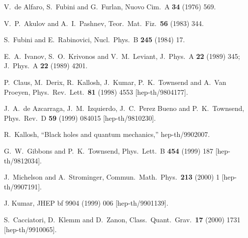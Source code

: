 \documentclass[a4paper,12pt]{article}
\begin{document}
\begin{thebibliography}{99}

V.~de Alfaro, S.~Fubini and G.~Furlan,
Nuovo Cim.\ A {\bf 34} (1976) 569.

V.~P.~Akulov and A.~I.~Pashnev,
Teor.\ Mat.\ Fiz.\  {\bf 56} (1983) 344.

S.~Fubini and E.~Rabinovici,
Nucl.\ Phys.\ B {\bf 245} (1984) 17.

E.~A.~Ivanov, S.~O.~Krivonos and V.~M.~Leviant,
J.\ Phys.\ A {\bf 22} (1989) 345;
J.\ Phys.\ A {\bf 22} (1989) 4201.

P.~Claus, M.~Derix, R.~Kallosh, J.~Kumar, P.~K.~Townsend and
A.~Van Proeyen,
Phys.\ Rev.\ Lett.\  {\bf 81} (1998) 4553
[hep-th/9804177].


J.~A.~de Azcarraga, J.~M.~Izquierdo, J.~C.~Perez Bueno and
P.~K.~Townsend,
Phys.\ Rev.\ D {\bf 59} (1999) 084015
[hep-th/9810230].


R.~Kallosh,
``Black holes and quantum mechanics,''
hep-th/9902007.


G.~W.~Gibbons and P.~K.~Townsend,
Phys.\ Lett.\ B {\bf 454} (1999) 187
[hep-th/9812034].


J.~Michelson and A.~Strominger,
Commun.\ Math.\ Phys.\  {\bf 213} (2000) 1
[hep-th/9907191].


J. Kumar,
JHEP {bf 9904} (1999)  006
[hep-th/9901139].


S.~Cacciatori, D.~Klemm and D.~Zanon,
Class.\ Quant.\ Grav.\  {\bf 17} (2000) 1731
[hep-th/9910065].


\end{thebibliography}
\end{document}
